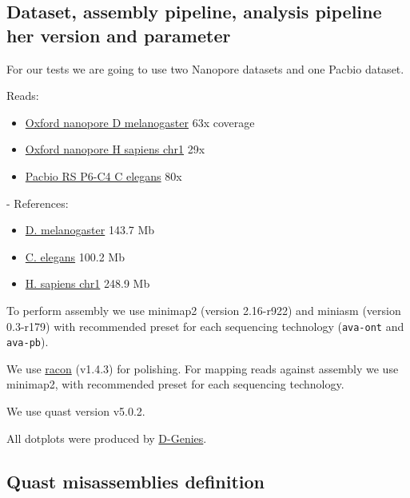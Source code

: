 \documentclass[./main.tex]{subfiles}
\begin{document}
\subsection{Dataset, assembly pipeline, analysis pipeline her version and parameter} \label{dataset-assembly-pipeline-analysis-pipeline-her-version-and-parameter}

For our tests we are going to use two Nanopore datasets and one Pacbio
dataset.

Reads:
\begin{itemize}
    \item \href{https://www.ebi.ac.uk/ena/data/view/SRX3676783}{Oxford nanopore D
melanogaster} 63x coverage
    \item \href{http://s3.amazonaws.com/nanopore-human-wgs/chr1.sorted.bam}{Oxford
nanopore H sapiens chr1} 29x
    \item \href{http://datasets.pacb.com.s3.amazonaws.com/2014/c_elegans/list.html}{Pacbio
RS P6-C4 C elegans} 80x
\end{itemize}

- References: 
\begin{itemize}
    \item \href{https://www.ncbi.nlm.nih.gov/assembly/GCF_000001215.4}{D.
melanogaster} 143.7 Mb
    \item \href{ftp://ftp.ensembl.org/pub/release-95/fasta/caenorhabditis_elegans/dna/Caenorhabditis_elegans.WBcel235.dna.toplevel.fa.gz}{C. elegans} 100.2 Mb
    \item \href{ftp://ftp.ensembl.org/pub/release-95/fasta/homo_sapiens/dna/Homo_sapiens.GRCh38.dna.chromosome.1.fa.gz}{H. sapiens chr1} 248.9 Mb
\end{itemize}
 

To perform assembly we use minimap2 (version 2.16-r922) and miniasm
(version 0.3-r179) with recommended preset for each sequencing
technology (\texttt{ava-ont} and \texttt{ava-pb}).

We use \href{https://github.com/lbcb-sci/racon}{racon} (v1.4.3) for
polishing. For mapping reads against assembly we use minimap2, with
recommended preset for each sequencing technology.

We use quast version v5.0.2.

All dotplots were produced by \href{http://dgenies.toulouse.inra.fr/}{D-Genies}.

\subsection{Quast misassemblies definition}\label{quast-misassemblies-definition}
\end{document}
